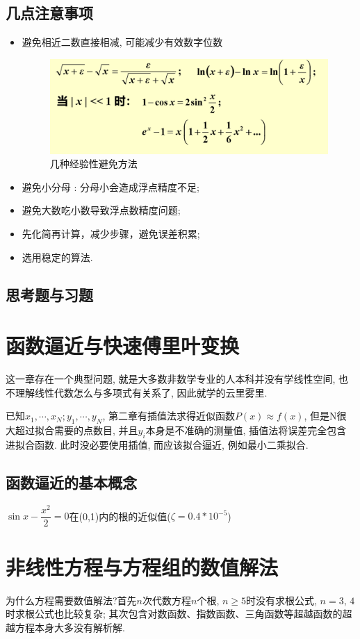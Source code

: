 \documentclass[lang=cn,newtx,12pt,scheme=chinese]{elegantbook}
\begin{document}
\section{几点注意事项}
\begin{itemize}
	\item 避免相近二数直接相减, 可能减少有效数字位数
	\begin{figure}[H]
		\centering
		\includegraphics[width=0.9\linewidth]{image/误差4}
		\caption{几种经验性避免方法}
		\label{fig:4}
	\end{figure}
	\item 避免小分母 :  分母小会造成浮点精度不足;
	\item 避免大数吃小数导致浮点数精度问题;
	\item 先化简再计算，减少步骤，避免误差积累;
	\item 选用稳定的算法.
\end{itemize}
\section{思考题与习题}
\chapter{函数逼近与快速傅里叶变换}
这一章存在一个典型问题, 就是大多数非数学专业的人本科并没有学线性空间, 也不理解线性代数怎么与多项式有关系了, 因此就学的云里雾里.

已知$x_1,\cdots,x_N;y_1,\cdots,y_N$, 第二章有插值法求得近似函数$P(x)\approx f(x)$, 但是N很大超过拟合需要的点数目, 并且$y_i$本身是不准确的测量值, 插值法将误差完全包含进拟合函数. 此时没必要使用插值, 而应该拟合逼近, 例如最小二乘拟合.
\section{函数逼近的基本概念}
$\sin x-\dfrac{x^2}{2}=0$在(0,1)内的根的近似值($\zeta=0.4*10^{-5}$)
\chapter{非线性方程与方程组的数值解法}
为什么方程需要数值解法?首先$n$次代数方程$n$个根, $n\ge 5$时没有求根公式, $n=3,\,4$时求根公式也比较复杂; 其次包含对数函数、指数函数、三角函数等超越函数的超越方程本身大多没有解析解.
\end{document}
